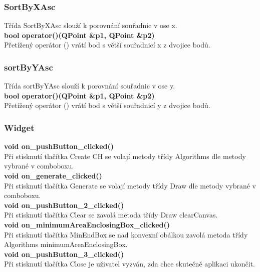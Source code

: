 \documentclass[a4paper, 12pt]{article}
\begin{document}
\subsubsection{SortByXAsc}
Třída SortByXAsc slouží k porovnání souřadnic v ose x.\\


\textbf{bool operator()(QPoint \&p1, QPoint \&p2)}\\
Přetížený operátor () vrátí bod s větší souřadnicí x z dvojice bodů.\\


\subsubsection{sortByYAsc}
Třída sortByYAsc slouží k porovnání souřadnic v ose y.
\\

\textbf{bool operator()(QPoint \&p1, QPoint \&p2)}\\
Přetížený operátor () vrátí bod s větší souřadnicí y z dvojice bodů.
\\

\subsubsection{Widget}


\textbf{void on\_pushButton\_clicked()}\\
Při stisknutí tlačítka Create CH se volají metody třídy Algorithms dle metody vybrané v comboboxu.
\\

\textbf{void on\_generate\_clicked()}\\
Při stisknutí tlačítka Generate se volají metody třídy Draw dle metody vybrané v comboboxu.
\\

\textbf{void on\_pushButton\_2\_clicked()}\\
Při stisknutí tlačítka Clear se zavolá metoda třídy Draw clearCanvas.
\\

\textbf{void on\_minimumAreaEnclosingBox\_clicked()}\\
Při stisknutí tlačítka MinEndBox se nad konvexní obálkou zavolá metoda třídy Algorithms minimumAreaEnclosingBox.
\\

\textbf{void on\_pushButton\_3\_clicked()}\\
Při stisknutí tlačítka Close je uživatel vyzván, zda chce skutečně aplikaci ukončit.
\\
\end{document}
